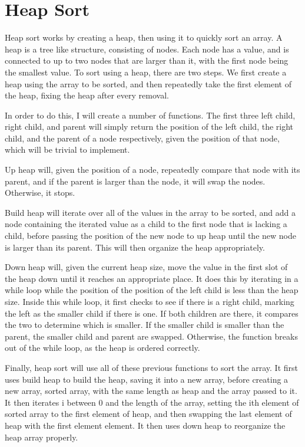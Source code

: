 \documentclass[11pt]{article}
\begin{document}
\section{Heap Sort}

Heap sort works by creating a heap, then using it to quickly sort an array. A heap is a tree like structure, consisting of nodes. Each node has a value, and is connected to up to two nodes that are larger than it, with the first node being the smallest value. To sort using a heap, there are two steps. We first create a heap using the array to be sorted, and then repeatedly take the first element of the heap, fixing the heap after every removal.

In order to do this, I will create a number of functions. The first three left child, right child, and parent will simply return the position of the left child, the right child, and the parent of a node respectively, given the position of that node, which will be trivial to implement.

Up heap will, given the position of a node, repeatedly compare that node with its parent, and if the parent is larger than the node, it will swap the nodes. Otherwise, it stops.

Build heap will iterate over all of the values in the array to be sorted, and add a node containing the iterated value as a child to the first node that is lacking a child, before passing the position of the new node to up heap until the new node is larger than its parent. This will then organize the heap appropriately.

Down heap will, given the current heap size, move the value in the first slot of the heap down until it reaches an appropriate place. It does this by iterating in a while loop while the position of the position of the left child is less than the heap size. Inside this while loop, it first checks to see if there is a right child, marking the left as the smaller child if there is one. If both children are there, it compares the two to determine which is smaller. If the smaller child is smaller than the parent, the smaller child and parent are swapped. Otherwise, the function breaks out of the while loop, as the heap is ordered correctly.

Finally, heap sort will use all of these previous functions to sort the array. It first uses build heap to build the heap, saving it into a new array, before creating a new array, sorted array, with the same length as heap and the array passed to it. It then iterates i between 0 and the length of the array, setting the ith element of sorted array to the first element of heap, and then swapping the last element of heap with the first element element. It then uses down heap to reorganize the heap array properly.
\end{document}
